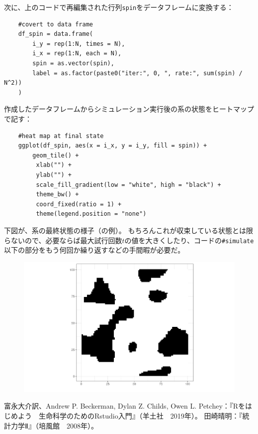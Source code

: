 \documentclass[fontsize = 12pt]{jlreq}
\begin{document}
次に、上のコードで再編集された行列\texttt{spin}をデータフレームに変換する：
\begin{lstlisting}
    #covert to data frame
    df_spin = data.frame(
        i_y = rep(1:N, times = N), 
        i_x = rep(1:N, each = N), 
        spin = as.vector(spin), 
        label = as.factor(paste0("iter:", 0, ", rate:", sum(spin) / N^2))
    )
\end{lstlisting}

作成したデータフレームからシミュレーション実行後の系の状態をヒートマップで記す：
\begin{lstlisting}
    #heat map at final state
    ggplot(df_spin, aes(x = i_x, y = i_y, fill = spin)) +
        geom_tile() +
         xlab("") +
         ylab("") +
         scale_fill_gradient(low = "white", high = "black") +
         theme_bw() +
         coord_fixed(ratio = 1) +
         theme(legend.position = "none")
\end{lstlisting}
下図が、系の最終状態の様子（の例）。
もちろんこれが収束している状態とは限らないので、必要ならば最大試行回数$t$の値を大きくしたり、コードの\texttt{\#simulate}以下の部分をもう何回か繰り返すなどの手間暇が必要だ。
\begin{figure}[H] 
    \centering 
    \includegraphics[width=15cm]{f2.png}
\end{figure}%

\begin{thebibliography}{99}
 富永大介訳、Andrew P. Beckerman, Dylan Z. Childs, Owen L. Petchey：『Rをはじめよう　生命科学のためのRstudio入門』（羊土社　2019年）。
 田崎晴明：『統計力学Ⅱ』（培風館　2008年）。
\end{thebibliography}
\end{document}
